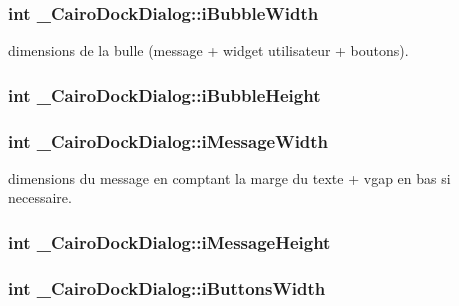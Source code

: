 \subsubsection{\setlength{\rightskip}{0pt plus 5cm}int {\bf \_\-CairoDockDialog::iBubbleWidth}}\label{struct__CairoDockDialog_cef84ec0585cb94b03a55e9467038853}


dimensions de la bulle (message + widget utilisateur + boutons). 

\subsubsection{\setlength{\rightskip}{0pt plus 5cm}int {\bf \_\-CairoDockDialog::iBubbleHeight}}\label{struct__CairoDockDialog_75420940bdde29ed53a62b2b9cae73d9}


\subsubsection{\setlength{\rightskip}{0pt plus 5cm}int {\bf \_\-CairoDockDialog::iMessageWidth}}\label{struct__CairoDockDialog_01f99c0b48be634341b06c862b3805cb}


dimensions du message en comptant la marge du texte + vgap en bas si necessaire. 

\subsubsection{\setlength{\rightskip}{0pt plus 5cm}int {\bf \_\-CairoDockDialog::iMessageHeight}}\label{struct__CairoDockDialog_dcd7d6ef7102243f3854cce8e0c15564}


\subsubsection{\setlength{\rightskip}{0pt plus 5cm}int {\bf \_\-CairoDockDialog::iButtonsWidth}}\label{struct__CairoDockDialog_69c2d090babf8f3c0a1db040a785f149}


